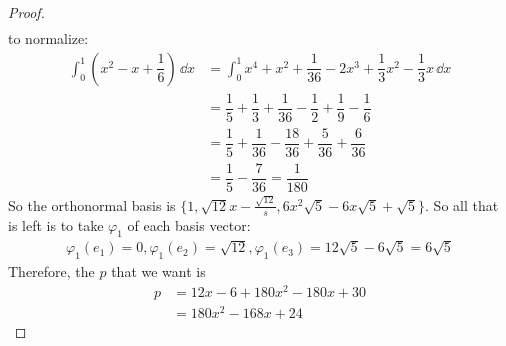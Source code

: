 \documentclass{article}
\begin{document}
\begin{proof}
\begin{align*}
	\end{align*}
	to normalize:
	\begin{align*}
		\int_{0}^{1} \left(x^{2} - x + \dfrac{1}{6}\right) \,\dd{x} &= \int_{0}^{1} x^{4} + x^{2} + \dfrac{1}{36} - 2x^{3} + \dfrac{1}{3}x^{2} - \dfrac{1}{3}x \,\dd{x} \\
									    &= \dfrac{1}{5} + \dfrac{1}{3} + \dfrac{1}{36} - \dfrac{1}{2} + \dfrac{1}{9} - \dfrac{1}{6} \\
									    &= \dfrac{1}{5} + \dfrac{1}{36} - \dfrac{18}{36} + \dfrac{5}{36} + \dfrac{6}{36}\\
									    &= \dfrac{1}{5} - \dfrac{7}{36} = \dfrac{1}{180}
	\end{align*}
	So the orthonormal basis is $\{1, \sqrt{12}x - \frac{\sqrt{12}}{s}, 6x^{2}\sqrt{5} - 6x\sqrt{5} + \sqrt{5}\}$. So all that is left is to take $\varphi_{1}$ of each basis vector:
	\begin{align*}
		\varphi_{1}(e_{1}) = 0, \varphi_{1}(e_{2}) = \sqrt{12}, \varphi_{1}(e_{3}) = 12\sqrt{5} - 6\sqrt{5} = 6\sqrt{5}
	\end{align*}
	Therefore, the $p$ that we want is 
	\begin{align*}
		p &= 12x - 6 + 180x^{2} - 180x + 30 \\
		  &= 180x^{2} - 168x + 24
	\end{align*}
\end{proof}
\end{document}
